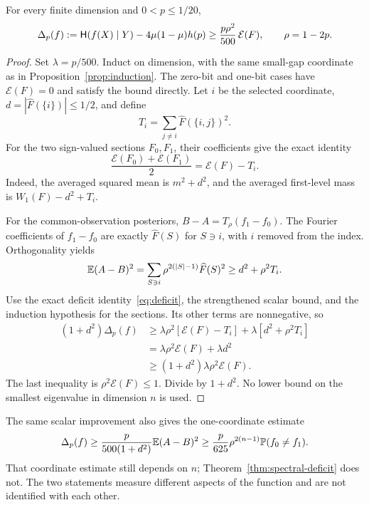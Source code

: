 \begin{theorem}\label{thm:spectral-deficit}
For every finite dimension and $0<p\le1/20$,
\begin{equation}\label{eq:spectral-deficit}
\Delta_p(f):=\mathsf H(f(X)\mid Y)-4\mu(1-\mu)h(p)
\ge\frac{p\rho^2}{500}\,\mathcal E(F),\qquad \rho=1-2p.
\end{equation}
\end{theorem}
\begin{proof}
Set $\lambda=p/500$. Induct on dimension, with the same small-gap coordinate as in Proposition~\ref{prop:induction}. The zero-bit and one-bit cases have $\mathcal E(F)=0$ and satisfy the bound directly. Let $i$ be the selected coordinate, $d=|\widehat F(\{i\})|\le1/2$, and define
\[
T_i=\sum_{j\ne i}\widehat F(\{i,j\})^2.
\]
For the two sign-valued sections $F_0,F_1$, their coefficients give the exact identity
\begin{equation}\label{eq:spectral-child-loss}
\frac{\mathcal E(F_0)+\mathcal E(F_1)}2=\mathcal E(F)-T_i.
\end{equation}
Indeed, the averaged squared mean is $m^2+d^2$, and the averaged first-level mass is $W_1(F)-d^2+T_i$.

For the common-observation posteriors, $B-A=T_\rho(f_1-f_0)$. The Fourier coefficients of $f_1-f_0$ are exactly $\widehat F(S)$ for $S\ni i$, with $i$ removed from the index. Orthogonality yields
\begin{equation}\label{eq:spectral-posterior}
\mathbb E(A-B)^2
=\sum_{S\ni i}\rho^{2(|S|-1)}\widehat F(S)^2
\ge d^2+\rho^2T_i.
\end{equation}
Use the exact deficit identity~\eqref{eq:deficit}, the strengthened scalar bound, and the induction hypothesis for the sections. Its other terms are nonnegative, so
\begin{align*}
(1+d^2)\Delta_p(f)
&\ge\lambda\rho^2[\mathcal E(F)-T_i]+\lambda[d^2+\rho^2T_i]\\
&=\lambda\rho^2\mathcal E(F)+\lambda d^2\\
&\ge(1+d^2)\lambda\rho^2\mathcal E(F).
\end{align*}
The last inequality is $\rho^2\mathcal E(F)\le1$. Divide by $1+d^2$. No lower bound on the smallest eigenvalue in dimension $n$ is used.
\end{proof}

The same scalar improvement also gives the one-coordinate estimate
\begin{equation}\label{eq:linear-coordinate-deficit}
\Delta_p(f)\ge\frac{p}{500(1+d^2)}\mathbb E(A-B)^2
\ge\frac p{625}\rho^{2(n-1)}\mathbb P(f_0\ne f_1).
\end{equation}
That coordinate estimate still depends on $n$; Theorem~\ref{thm:spectral-deficit} does not. The two statements measure different aspects of the function and are not identified with each other.

